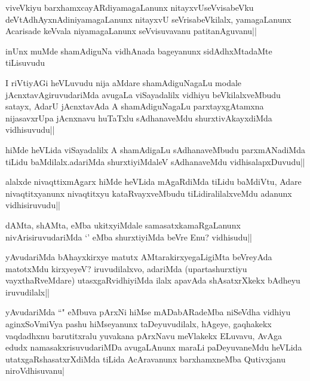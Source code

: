 \begin{artha}
viveVkiyu barxhamxcayARdiyamagaLanunx nitayxvUseVvisabeVku 
deVtAdhAyxnAdiniyamagaLanunx nitayxvU seVrisabeVkilalx, yamagaLanunx Acarisade keVvala 
niyamagaLanunx seVvisuvavanu patitanAguvanu||
\end{artha}

\begin{artha}
inUnx muMde shamAdiguNa vidhAnada bageyanunx sidAdhxMtadaMte tiLisuvudu
\end{artha}

\begin{artha}
I riVtiyAGi heVLuvudu nija aMdare shamAdiguNagaLu modale jAcnxtavAgiruvudariMda avugaLa viSayadalilx vidhiyu beVkilalxveMbudu satayx, AdarU jAcnxtavAda A shamAdiguNagaLu parxtayxgAtamxna nijasavxrUpa jAcnxnavu huTaTxlu sAdhanaveMdu shurxtivAkayxdiMda vidhisuvudu||
\end{artha}



\begin{artha}
hiMde heVLida viSayadalilx A shamAdigaLu sAdhanaveMbudu parxmANadiMda tiLidu baMdilalx.adariMda shurxtiyiMdaleV sAdhanaveMdu vidhisalapxDuvudu||
\end{artha}

\begin{artha}
alalxde nivaqttixmAgarx hiMde heVLida mAgaRdiMda tiLidu baMdiVtu, Adare nivaqtitxyanunx nivaqtitxyu kataRvayxveMbudu tiLidiralilalxveMdu adanunx vidhisiruvudu||
\end{artha}


\begin{artha}
dAMta, shAMta, eMba ukitxyiMdale samasatxkamaRgaLanunx nivArisiruvudariMda `\stext' eMba shurxtiyiMda beVre Enu? vidhisudu||
\end{artha}

\begin{artha}
yAvudariMda bAhayxkirxye matutx AMtarakirxyegaLigiMta beVreyAda matotxMdu kirxyeyeV? iruvudilalxvo, adariMda (upartashurxtiyu vayxthaRveMdare) utasxgaRvidhiyiMda ilalx apavAda shAsatxrXkekx bAdheyu iruvudilalx||
\end{artha}


\begin{artha}
yAvudariMda ``\stext" eMbuva pArxNi hiMse mADabARadeMba niSeVdha vidhiyu aginxSoVmiVya pashu hiMseyanunx taDeyuvudilalx, hAgeye, gaqhakekx vaqdadhxnu barutitxralu yuvakana pArxNavu meVlakekx ELuvavu, AvAga edudx namasakxrisuvudariMDa avugaLAnunx maraLi paDeyuvaneMdu heVLida utatxgaRshasatxrXdiMda tiLida AcAravanunx barxhamxneMba Qutivxjanu niroVdhisuvanu|
\end{artha}

